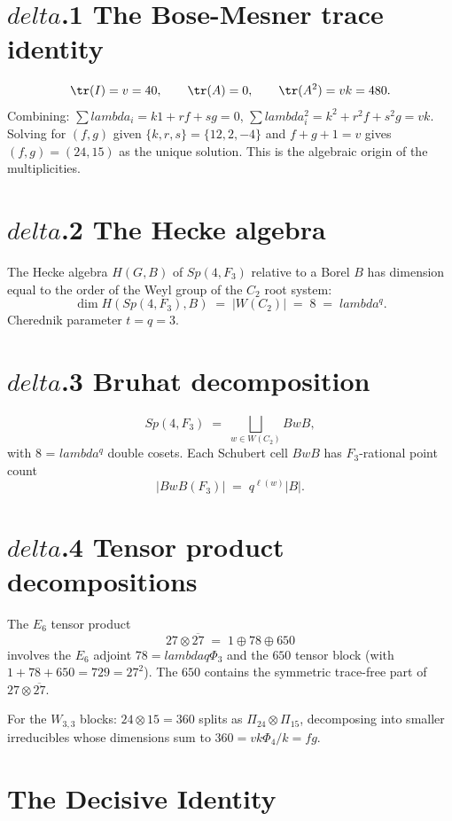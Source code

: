 \documentclass[12pt,a4paper]{article}
\def\mathbb#1{#1}%
\def\mathrm#1{#1}%
\def\mathbf#1{#1}%
\def\mathcal#1{#1}%
\def\delta{delta}%
\def\lambda{lambda}%
\def\Phi#1{Phi#1}%
\def\cdot{ }%
\theoremstyle{definition}
\newcommand{\Sp}{\mathrm{Sp}}
\newcommand{\FF}{\mathbb{F}}
\begin{document}
\section*{$\delta$.1 \quad The Bose-Mesner trace identity}
\[
\tr(I) = v = 40,\qquad \tr(A) = 0,\qquad \tr(A^2) = vk = 480.
\]
Combining: $\sum \lambda_i = k\cdot 1 + r\cdot f + s\cdot g = 0$,
$\sum \lambda_i^2 = k^2 + r^2 f + s^2 g = vk$. Solving for
$(f, g)$ given $\{k, r, s\} = \{12, 2, -4\}$ and $f + g + 1 = v$
gives $(f, g) = (24, 15)$ as the unique solution. This is
the algebraic origin of the multiplicities.

\section*{$\delta$.2 \quad The Hecke algebra}
The Hecke algebra $\mathcal{H}(G, B)$ of $\Sp(4, \FF_3)$ relative to a
Borel $B$ has dimension equal to the order of the Weyl group of the
$C_2$ root system:
\[
\dim\mathcal{H}(\Sp(4,\FF_3), B) \;=\; |W(C_2)| \;=\; 8 \;=\; \lambda^q.
\]
Cherednik parameter $t = q = 3$.

\section*{$\delta$.3 \quad Bruhat decomposition}
\[
\Sp(4, \FF_3) \;=\; \bigsqcup_{w \in W(C_2)} BwB,
\]
with 8 = $\lambda^q$ double cosets. Each Schubert cell $BwB$ has
$\FF_3$-rational point count
\[
|BwB(\FF_3)| \;=\; q^{\ell(w)}\cdot|B|.
\]

\section*{$\delta$.4 \quad Tensor product decompositions}
The $E_6$ tensor product
\[
\mathbf{27}\otimes\overline{\mathbf{27}} \;=\; \mathbf{1}\oplus\mathbf{78}\oplus\mathbf{650}
\]
involves the $E_6$ adjoint $\mathbf{78} = \lambda q\Phi_3$ and the
$\mathbf{650}$ tensor block (with $1 + 78 + 650 = 729 = 27^2$). The
$\mathbf{650}$ contains the symmetric trace-free part of $\mathbf{27}\otimes\overline{\mathbf{27}}$.

For the $W_{3,3}$ blocks: $\mathbf{24}\otimes\mathbf{15} = 360$
splits as $\Pi_{24}\otimes\Pi_{15}$, decomposing into smaller
irreducibles whose dimensions sum to $360 = vk\cdot\Phi_4/k = f\cdot g$.

\section*{The Decisive Identity}
\end{document}
